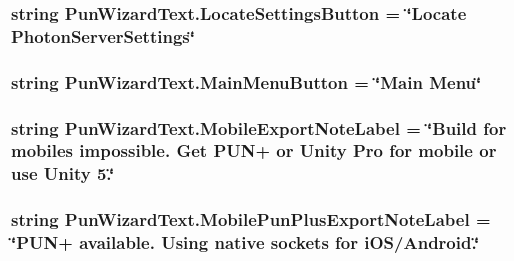 \subsubsection[{\texorpdfstring{Locate\+Settings\+Button}{LocateSettingsButton}}]{\setlength{\rightskip}{0pt plus 5cm}string Pun\+Wizard\+Text.\+Locate\+Settings\+Button = \char`\"{}Locate Photon\+Server\+Settings\char`\"{}}\hypertarget{class_pun_wizard_text_afac7dc3b8eb42ba802944f7ed7a0722f}{}\label{class_pun_wizard_text_afac7dc3b8eb42ba802944f7ed7a0722f}
\subsubsection[{\texorpdfstring{Main\+Menu\+Button}{MainMenuButton}}]{\setlength{\rightskip}{0pt plus 5cm}string Pun\+Wizard\+Text.\+Main\+Menu\+Button = \char`\"{}Main Menu\char`\"{}}\hypertarget{class_pun_wizard_text_a090688891cabaa9dac36c28a9902ad20}{}\label{class_pun_wizard_text_a090688891cabaa9dac36c28a9902ad20}
\subsubsection[{\texorpdfstring{Mobile\+Export\+Note\+Label}{MobileExportNoteLabel}}]{\setlength{\rightskip}{0pt plus 5cm}string Pun\+Wizard\+Text.\+Mobile\+Export\+Note\+Label = \char`\"{}Build for mobiles impossible. Get P\+UN+ or Unity Pro for mobile or use Unity 5.\char`\"{}}\hypertarget{class_pun_wizard_text_aebc740e552f294483c01928873c21226}{}\label{class_pun_wizard_text_aebc740e552f294483c01928873c21226}
\subsubsection[{\texorpdfstring{Mobile\+Pun\+Plus\+Export\+Note\+Label}{MobilePunPlusExportNoteLabel}}]{\setlength{\rightskip}{0pt plus 5cm}string Pun\+Wizard\+Text.\+Mobile\+Pun\+Plus\+Export\+Note\+Label = \char`\"{}P\+UN+ available. Using native sockets for i\+OS/Android.\char`\"{}}\hypertarget{class_pun_wizard_text_a018209b0518c1a8ce5c5cc64848d8099}{}\label{class_pun_wizard_text_a018209b0518c1a8ce5c5cc64848d8099}
